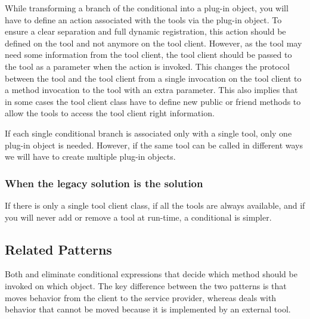 \documentclass[a4paper,10pt,twoside]{book}
\begin{document}
\begin{bulletlist}
\item While transforming a branch of the conditional into a plug-in object, you will have to define an action associated with the tools via the plug-in object. To ensure a clear separation and full dynamic registration, this action should be defined on the tool and not anymore on the tool client. However, as the tool may need some information from the tool client, the tool client should be passed to the tool as a parameter when the action is invoked. This changes the protocol between the tool and the tool client from a single invocation on the tool client to a method invocation to the tool with an extra parameter. This also implies that in some cases the tool client class have to define new public or friend methods to allow the tools to access the tool client right information. 

\item If each single conditional branch is associated only with a single tool, only one plug-in object is needed. However, if the same tool can be called in different ways we will have to create multiple plug-in objects.
\end{bulletlist}

\subsubsection*{When the legacy solution is the solution}

\begin{bulletlist}
\item If there is only a single tool client class, if all the tools are always available, and if you will never add or remove a tool at run-time, a conditional is simpler.
\end{bulletlist}

\subsection*{Related Patterns}

Both  and  eliminate conditional expressions that decide which method should be invoked on which object. The key difference between the two patterns is that  moves behavior from the client to the service provider, whereas  deals with behavior that cannot be moved because it is implemented by an external tool.
\end{document}
